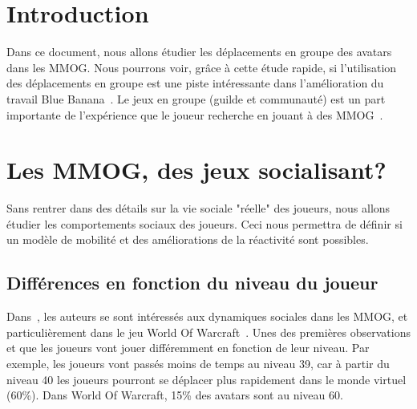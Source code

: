 \documentclass[11pt,a4paper]{article}
\begin{document}

\newpage
\tableofcontents
\newpage



\section{Introduction}
Dans ce document, nous allons étudier les déplacements en groupe des avatars dans les MMOG. Nous pourrons voir, grâce à cette étude rapide, si l'utilisation des déplacements en groupe est une piste intéressante dans l'amélioration du travail Blue Banana~\cite{191}. Le jeux en groupe (guilde et communauté) est un part importante de l'expérience que le joueur recherche en jouant à des MMOG~\cite{1501834,1255052}.

\newpage
\section{Les MMOG, des jeux socialisant?}
Sans rentrer dans des détails sur la vie sociale "réelle" des joueurs, nous allons étudier les comportements sociaux des joueurs. Ceci nous permettra de définir si un modèle de mobilité et des améliorations de la réactivité sont possibles.
\subsection{Différences en fonction du niveau du joueur}
Dans~\cite{1124834}, les auteurs se sont intéressés aux dynamiques sociales dans les MMOG, et particulièrement dans le jeu World Of Warcraft~\cite{wow}. Unes des premières observations et que les joueurs vont jouer différemment en fonction de leur niveau. Par exemple, les joueurs vont passés moins de temps au niveau 39, car à partir du niveau 40 les joueurs pourront se déplacer plus rapidement dans le monde virtuel (60\%). Dans World Of Warcraft, 15\% des avatars sont au niveau 60.
\end{document}
